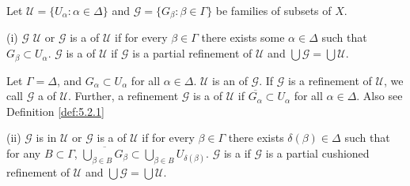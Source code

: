 \documentclass[prelim.tex]{subfiles}
\begin{document}
{ \label{def:1.1.2} Let
	$\mathscr{U} = \{ U_\alpha: \alpha\in \Delta\}$ and 
	$\mathscr{G} = \{ G_\beta: \beta\in \Gamma\}$
	be families of subsets of $X$.
	
\textup{(i)} $\mathscr{G}$ 
	   $\mathscr{U}$ or $\mathscr{G}$ is a 
	    of $\mathscr{U}$ if for every $\beta\in \Gamma$
	    there exists some $\alpha\in \Delta$ such that 
	    $G_\beta\subset U_\alpha$.
  $\mathscr{G}$ is a 
  of $\mathscr{U}$ if $\mathscr{G}$ is a partial refinement of 
  $\mathscr{U}$ and $\bigcup\mathscr{G} = \bigcup\mathscr{U}$.

Let $\Gamma = \Delta$, and $G_\alpha \subset U_\alpha$ for all $\alpha\in \Delta$.
$\mathscr{U}$ is an 
of $\mathscr{G}$.
If $\mathscr{G}$ is a  refinement of $\mathscr{U}$, we call $\mathscr{G}$ a
of $\mathscr{U}$.
Further, a refinement $\mathscr{G}$ is a 
of $\mathscr{U}$
if $\overline{G_\alpha} \subset U_\alpha$ for all $\alpha\in \Delta$.
Also see Definition \ref{def:5.2.1}
	    
\textup{(ii)} $\mathscr{G}$ is 
	in $\mathscr{U}$ or
	$\mathscr{G}$ is a 
	of $\mathscr{U}$
	if for every $\beta\in\Gamma$ there exists $\delta(\beta)\in\Delta$ such that for any $B\subset\Gamma$, $\overline{\bigcup_{\beta\in B}G_\beta} \subset \bigcup_{\beta\in B}U_{\delta(\beta)}$. 
	$\mathscr{G}$ is a 
	if $\mathscr{G}$ is a partial cushioned refinement
	of $\mathscr{U}$ and $\bigcup\mathscr{G} = \bigcup\mathscr{U} $.
} %
\end{document}

